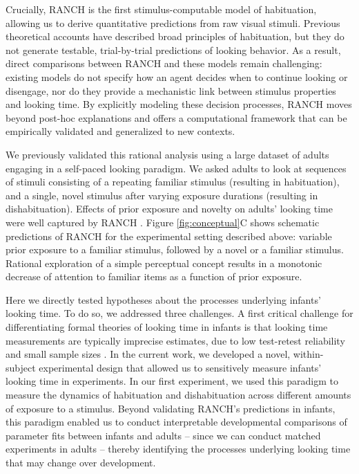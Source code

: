 \documentclass[
]{article}
\begin{document}
Crucially, RANCH is the first stimulus-computable model of habituation, allowing us to derive quantitative predictions from raw visual stimuli. Previous theoretical accounts have described broad principles of habituation, but they do not generate testable, trial-by-trial predictions of looking behavior. As a result, direct comparisons between RANCH and these models remain challenging: existing models do not specify how an agent decides when to continue looking or disengage, nor do they provide a mechanistic link between stimulus properties and looking time. By explicitly modeling these decision processes, RANCH moves beyond post-hoc explanations and offers a computational framework that can be empirically validated and generalized to new contexts.


We previously validated this rational analysis using a large dataset of adults engaging in a self-paced looking paradigm. We asked adults to look at sequences of stimuli consisting of a repeating familiar stimulus (resulting in habituation), and a single, novel stimulus after varying exposure durations (resulting in dishabituation). Effects of prior exposure and novelty on adults' looking time were well captured by RANCH \autocite{cao2023habituation}. Figure \ref{fig:conceptual}C shows schematic predictions of RANCH for the experimental setting described above: variable prior exposure to a familiar stimulus, followed by a novel or a familiar stimulus. Rational exploration of a simple perceptual concept results in a monotonic decrease of attention to familiar items as a function of prior exposure.

Here we directly tested hypotheses about the processes underlying infants' looking time. To do so, we addressed three challenges. A first critical challenge for differentiating formal theories of looking time in infants is that looking time measurements are typically imprecise estimates, due to low test-retest reliability and small sample sizes \autocite{schreiner2022limited, oakes2017sample}. In the current work, we developed a novel, within-subject experimental design that allowed us to sensitively measure infants' looking time in experiments. In our first experiment, we used this paradigm to measure the dynamics of habituation and dishabituation across different amounts of exposure to a stimulus. Beyond validating RANCH's predictions in infants, this paradigm enabled us to conduct interpretable developmental comparisons of parameter fits between infants and adults -- since we can conduct matched experiments in adults -- thereby identifying the processes underlying looking time that may change over development.
\end{document}
